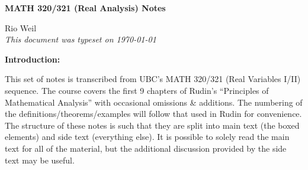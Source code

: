 \documentclass[10pt]{article}
\begin{document}
\begin{tcolorbox}
  \begin{center}
  \begin{Large}
    \textbf{MATH 320/321 (Real Analysis) Notes} \\
    \vspace{5pt}
  \end{Large}
  \begin{large}
        Rio Weil \\
\vspace{5pt}
    \emph{This document was typeset on \today}
  \end{large}
  \end{center}
\end{tcolorbox}

\begin{center}
  \textbf{Introduction:}
  
  This set of notes is transcribed from UBC's MATH 320/321 (Real Variables I/II) sequence. The course covers the first 9 chapters of Rudin's ``Principles of Mathematical Analysis'' with occasional omissions \& additions. The numbering of the definitions/theorems/examples will follow that used in Rudin for convenience. The structure of these notes is such that they are split into main text (the boxed elements) and side text (everything else). It is possible to solely read the main text for all of the material, but the additional discussion provided by the side text may be useful.
\end{center}

\tableofcontents

\newpage










\end{document}
